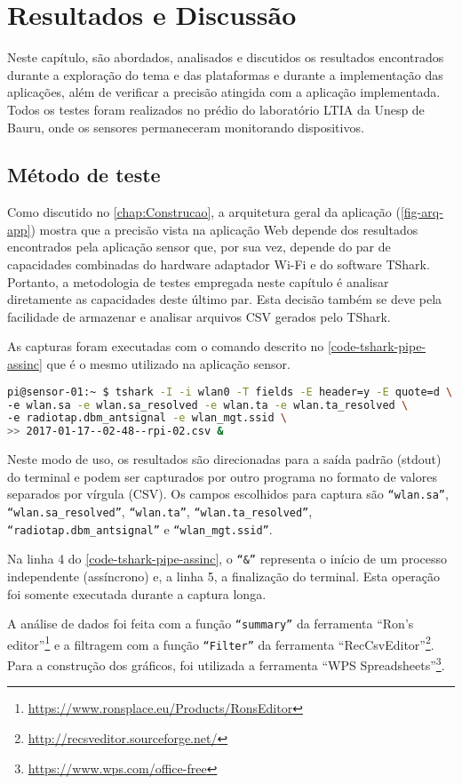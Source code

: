 \chapter{Resultados e Discussão}
\label{chap:resultados}

Neste capítulo, são abordados, analisados e discutidos os resultados encontrados
durante a exploração do tema e das plataformas e durante a implementação das
aplicações, além de verificar a precisão atingida com a aplicação implementada.
Todos os testes foram realizados no prédio do laboratório
LTIA da Unesp de Bauru, onde os sensores permaneceram monitorando dispositivos.

\section{Método de teste}
\label{sec:metodo-teste}

Como discutido no \autoref{chap:Construcao}, a arquitetura geral da aplicação (\autoref{fig-arq-app})
mostra que a precisão vista na aplicação Web depende dos resultados
encontrados pela aplicação sensor que, por sua vez, depende do par de
capacidades combinadas do hardware adaptador Wi-Fi e do software
TShark. Portanto, a metodologia de testes empregada neste capítulo é
analisar diretamente as capacidades deste último par. Esta decisão também se
deve pela facilidade de armazenar e analisar arquivos CSV gerados pelo
TShark.

As capturas foram executadas com o comando descrito no \autoref{code-tshark-pipe-assinc}
que é o mesmo utilizado na aplicação sensor.

\begin{lstlisting}[language=bash,caption={TShark e redirecionamento da saída para arquivo assíncrono},label=code-tshark-pipe-assinc]
pi@sensor-01:~ $ tshark -I -i wlan0 -T fields -E header=y -E quote=d \
-e wlan.sa -e wlan.sa_resolved -e wlan.ta -e wlan.ta_resolved \
-e radiotap.dbm_antsignal -e wlan_mgt.ssid \
>> 2017-01-17--02-48--rpi-02.csv &
\end{lstlisting}

Neste modo de uso, os resultados são direcionadas para a saída padrão
(stdout)  do terminal e podem ser capturados por outro programa no formato
de valores separados por vírgula (CSV). Os campos escolhidos para captura
são \texttt{``wlan.sa''}, \texttt{``wlan.sa\_resolved''}, \texttt{``wlan.ta''},
\texttt{``wlan.ta\_resolved''}, \texttt{``radiotap.dbm\_antsignal''} e \texttt{``wlan\_mgt.ssid''}.

Na linha 4 do \autoref{code-tshark-pipe-assinc}, o \texttt{``\&''} representa o início
de um processo independente (assíncrono) e, a linha 5, a finalização do terminal.
Esta operação foi somente executada durante a captura longa.

A análise de dados foi feita com a função \texttt{``summary''} da ferramenta
``Ron’s editor''\footnote{\url{https://www.ronsplace.eu/Products/RonsEditor}}
e a filtragem com a função \texttt{``Filter''} da ferramenta
``RecCsvEditor''\footnote{\url{http://recsveditor.sourceforge.net/}}. Para a
construção dos gráficos, foi utilizada a ferramenta
``WPS Spreadsheets''\footnote{\url{https://www.wps.com/office-free}}.

